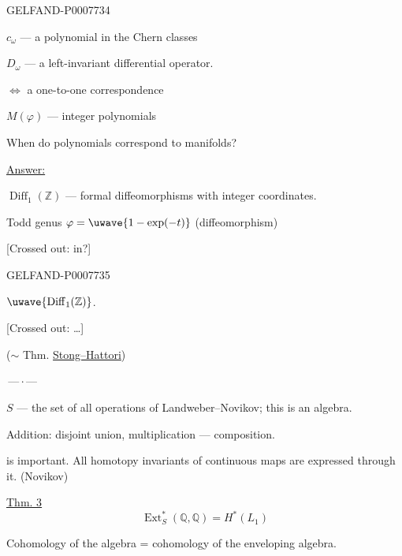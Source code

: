 \begin{GelfandAdjacentEvidence}{GELFAND-P000773}{4}


\(c_\omega\) --- a polynomial in the Chern classes

\(D_\omega\) --- a left-invariant differential operator.

\(\Longleftrightarrow\) a one-to-one correspondence

\(M(\varphi)\) --- integer polynomials

When do polynomials correspond to manifolds?

\underline{Answer:}


\(\operatorname{Diff}_1(\mathbb Z)\) --- formal diffeomorphisms with integer coordinates.

Todd genus \(\varphi=\uwave{1-\exp(-t)}\) (diffeomorphism)


[Crossed out: in?]
\end{GelfandAdjacentEvidence}
\begin{GelfandAdjacentEvidence}{GELFAND-P000773}{5}

\(\uwave{\operatorname{Diff}_1(\mathbb Z)}\).

[Crossed out: …]
\end{GelfandAdjacentEvidence}

(\(\sim\) Thm. \underline{Stong--Hattori})

\begin{center}\(\text{---}\,\cdot\,\text{---}\)\end{center}

\(S\) --- the set of all operations of Landweber--Novikov; this is an algebra.

Addition: disjoint union, multiplication --- composition.

 is important. All homotopy invariants of continuous maps are expressed through it. (Novikov)

\underline{Thm. 3}
\[
\operatorname{Ext}_S^*(\mathbb Q,\mathbb Q)=H^*(L_1)
\]

Cohomology of the algebra = cohomology of the enveloping algebra.


